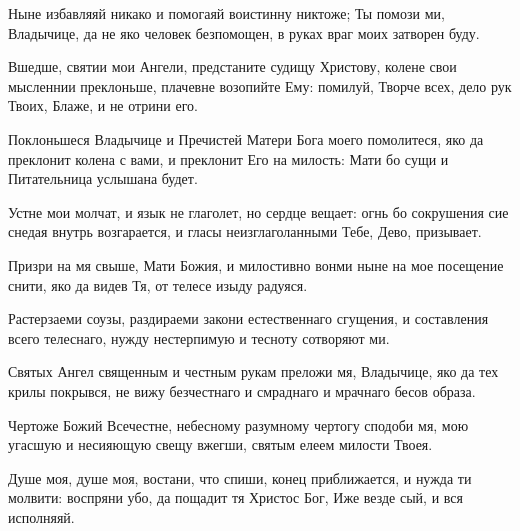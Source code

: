 \begin{mymulticols}

Ныне избавляяй никако и помогаяй воистинну никтоже; Ты помози ми, Владычице, да не яко человек безпомощен, в руках враг моих затворен буду. 

\slavan

Вшедше, святии мои Ангели, предстаните судищу Христову, колене свои мысленнии преклоньше, плачевне возопийте Ему: помилуй, Творче всех, дело рук Твоих, Блаже, и не отрини его. 

\inynen

Поклоньшеся Владычице и Пречистей Матери Бога моего помолитеся, яко да преклонит колена с вами, и преклонит Его на милость: Мати бо сущи и Питательница услышана будет.




Устне мои молчат, и язык не глаголет, но сердце вещает: огнь бо сокрушения сие снедая внутрь возгарается, и гласы неизглаголанными Тебе, Дево, призывает. 


Призри на мя свыше, Мати Божия, и милостивно вонми ныне на мое посещение снити, яко да видев Тя, от телесе изыду радуяся. 


Растерзаеми соузы, раздираеми закони естественнаго сгущения, и составления всего телеснаго, нужду нестерпимую и тесноту сотворяют ми. 

\slavan

Святых Ангел священным и честным рукам преложи мя, Владычице, яко да тех крилы покрывся, не вижу безчестнаго и смраднаго и мрачнаго бесов образа. 

\inynen

Чертоже Божий Всечестне, небесному разумному чертогу сподоби мя, мою угасшую и несияющую свещу вжегши, святым елеем милости Твоея.


Душе моя, душе моя, востани, что спиши, конец приближается, и нужда ти молвити: воспряни убо, да пощадит тя Христос Бог, Иже везде сый, и вся исполняяй. 



\end{mymulticols}
